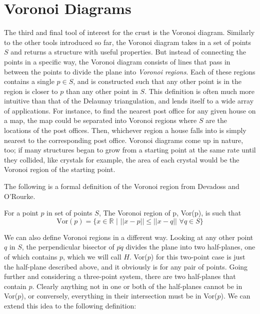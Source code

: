 \section{Voronoi Diagrams}

The third and final tool of interest for the crust is the Voronoi diagram.
Similarly to the other tools introduced so far, the Voronoi diagram takes in a set of points $S$ and returns a structure with useful properties.
But instead of connecting the points in a specific way, the Voronoi diagram consists of lines that pass in between the points to divide the plane into \textit{Voronoi regions}.
Each of these regions contains a single $p\in S$, and is constructed such that any other point is in the region is closer to $p$ than any other point in $S$.
This definition is often much more intuitive than that of the Delaunay triangulation, and lends itself to a wide array of applications.
For instance, to find the nearest post office for any given house on a map, the map could be separated into Voronoi regions where $S$ are the locations of the post offices.
Then, whichever region a house falls into is simply nearest to the corresponding post office.
Voronoi diagrams come up in nature, too;
if many structures began to grow from a starting point at the same rate until they collided, like crystals for example, the area of each crystal would be the Voronoi region of the starting point.

The following is a formal definition of the Voronoi region from Devadoss and O'Rourke.


\begin{definition}
	For a point $p$ in set of points $S$, The Voronoi region of p, Vor(p), is such that
	\[ \mathrm{Vor}(p) = \lbrace x\in \mathbb{R} \hspace{4pt} | \hspace{4pt} ||x-p|| \le ||x-q|| \hspace{4pt} \forall q \in S \rbrace \]
\end{definition}


We can also define Voronoi regions in a different way.
Looking at any other point $q$ in $S$, the perpendicular bisector of $\overline{pq}$ divides the plane into two half-planes, one of which contains $p$, which we will call $H$.
Vor($p$) for this two-point case is just the half-plane described above, and it obviously is for any pair of points.
Going further and considering a three-point system, there are two half-planes that contain $p$.
Clearly anything not in one or both of the half-planes cannot be in Vor($p$), or conversely, everything in their intersection must be in Vor($p$).
We can extend this idea to the following definition:

